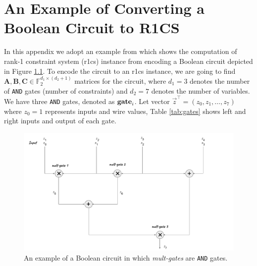 \chapter{An Example of Converting a Boolean Circuit to R1CS}\label{a_ch:r1cs_from_circuit}


In this appendix we adopt an example from \cite{Gong2024} which shows the computation of rank-1 constraint system (\gls{r1cs}) instance from encoding a Boolean circuit depicted in Figure \ref{fig:Arith-circuit}. To encode the circuit to an \gls{r1cs} instance, we are going to find $\mathbf{A}, \mathbf{B}, \mathbf{C} \in \mathbb{F}_2^{{d_1}\times{(d_2+1)}}$ matrices for the circuit, where $d_1 = 3$ denotes the number of  \texttt{AND} gates (number of constraints) and $d_2 = 7$ denotes the number of variables. We have three \texttt{AND} gates, denoted as $\text{\textbf{gate}}_i$. Let vector $\vec{z}^\intercal=(z_0, z_1, \ldots, z_7)$ where $z_0=1$ represents inputs and wire values, Table \ref{tab:gates} shows left and right inputs and output of each gate.

\begin{figure}[h]
	\centering
	\includegraphics[width=\textwidth]{Figures/Circuit.pdf}
	\caption[An example of a Boolean circuit]{An example of a Boolean circuit in which \textit{mult-gates} are  \texttt{AND} gates.}
	\label{fig:Arith-circuit}
\end{figure}




